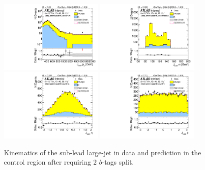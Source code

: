\begin{figure}[htbp!]
\begin{center}
\includegraphics[width=0.45\textwidth,angle=-90]{figures/boosted/Control/b77_TwoTag_split_Control_sublHCand_Pt_m_1.pdf}
\includegraphics[width=0.45\textwidth,angle=-90]{figures/boosted/Control/b77_TwoTag_split_Control_sublHCand_Mass_s.pdf}\\
\includegraphics[width=0.45\textwidth,angle=-90]{figures/boosted/Control/b77_TwoTag_split_Control_sublHCand_Eta.pdf}
\includegraphics[width=0.45\textwidth,angle=-90]{figures/boosted/Control/b77_TwoTag_split_Control_sublHCand_Phi.pdf}
  \caption{Kinematics of the sub-lead large-\R jet in data and prediction in the control region after requiring 2 $b$-tags split. }
  \label{fig:boosted-2bs-control-ak10-subl}
\end{center}
\end{figure}

